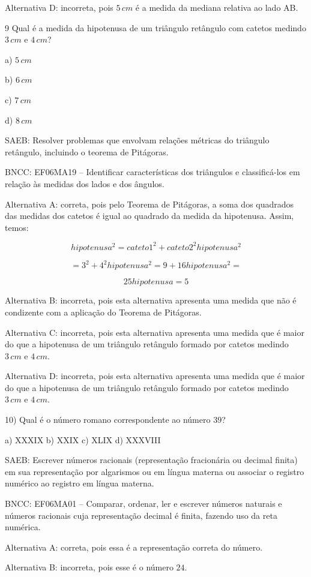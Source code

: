 Alternativa D: incorreta, pois $5\,cm$ é a medida da mediana relativa ao
lado AB.

\num{9}  Qual é a medida da hipotenusa de um triângulo retângulo com catetos
medindo $3\,cm$ e $4\,cm$?

a) $5\,cm$

b) $6\,cm$

c) $7\,cm$

d) $8\,cm$

SAEB: Resolver problemas que envolvam relações métricas do triângulo
retângulo, incluindo o teorema de Pitágoras.

BNCC: EF06MA19 -- Identificar características dos triângulos e
classificá-los em relação às medidas dos lados e dos ângulos.

Alternativa A: correta, pois pelo Teorema de Pitágoras, a soma dos
quadrados das medidas dos catetos é igual ao quadrado da medida da
hipotenusa. Assim, temos: 


$$hipotenusa^2 = cateto1^2 + cateto2^2 hipotenusa^2$$

$$= 3^2 + 4^2 hipotenusa^2 = 9 + 16 hipotenusa^2 =$$

$$25 hipotenusa = 5$$

Alternativa B: incorreta, pois esta alternativa apresenta uma medida que
não é condizente com a aplicação do Teorema de Pitágoras.

Alternativa C: incorreta, pois esta alternativa apresenta uma medida que
é maior do que a hipotenusa de um triângulo retângulo formado por
catetos medindo $3\,cm$ e $4\,cm$.

Alternativa D: incorreta, pois esta alternativa apresenta uma medida que
é maior do que a hipotenusa de um triângulo retângulo formado por
catetos medindo $3\,cm$ e $4\,cm$.

10) Qual é o número romano correspondente ao número $39$?

a) XXXIX b) XXIX c) XLIX d) XXXVIII

SAEB: Escrever números racionais (representação fracionária ou decimal
finita) em sua representação por algarismos ou em língua materna ou
associar o registro numérico ao registro em língua materna.

BNCC: EF06MA01 -- Comparar, ordenar, ler e escrever números naturais e
números racionais cuja representação decimal é finita, fazendo uso da
reta numérica.

Alternativa A: correta, pois essa é a representação correta do número.

Alternativa B: incorreta, pois esse é o número $24$.

